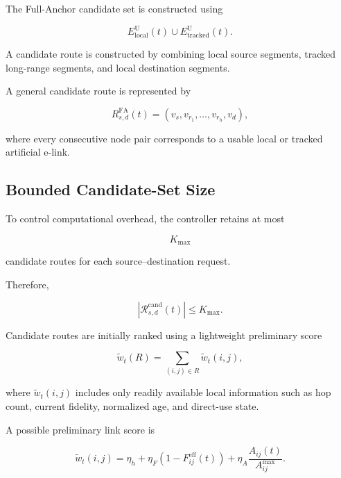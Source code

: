 The Full-Anchor candidate set is constructed using

\begin{equation}
    E_{\mathrm{local}}^{\mathrm{U}}(t)
    \cup
    E_{\mathrm{tracked}}^{\mathrm{U}}(t).
\end{equation}

A candidate route is constructed by combining local source segments, tracked long-range segments, and local destination segments.

A general candidate route is represented by

\begin{equation}
    R_{s,d}^{\mathrm{FA}}(t)
    =
    \left(
    v_s,
    v_{r_1},
    \ldots,
    v_{r_h},
    v_d
    \right),
\end{equation}

where every consecutive node pair corresponds to a usable local or tracked artificial e-link.
\subsection{Bounded Candidate-Set Size}

To control computational overhead, the controller retains at most

\begin{equation}
    K_{\max}
\end{equation}

candidate routes for each source--destination request.

Therefore,

\begin{equation}
    \left|
    \mathcal{R}_{s,d}^{\mathrm{cand}}(t)
    \right|
    \leq
    K_{\max}.
\end{equation}

Candidate routes are initially ranked using a lightweight preliminary score

\begin{equation}
    \widetilde{w}_t(R)
    =
    \sum_{(i,j)\in R}
    \widetilde{w}_t(i,j),
\end{equation}

where $\widetilde{w}_t(i,j)$ includes only readily available local information such as hop count, current fidelity, normalized age, and direct-use state.

A possible preliminary link score is

\begin{equation}
    \widetilde{w}_t(i,j)
    =
    \eta_h
    +
    \eta_F
    \left(
    1-F_{ij}^{\mathrm{eff}}(t)
    \right)
    +
    \eta_A
    \frac{
    A_{ij}(t)
    }{
    A_{ij}^{\max}
    }.
\end{equation}

